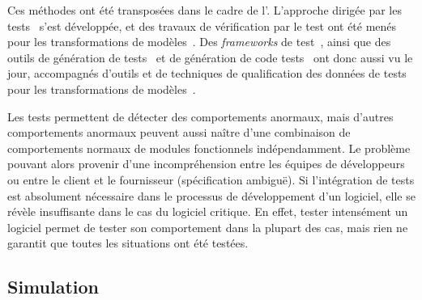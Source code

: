 Ces méthodes ont été transposées dans le cadre de l'{\idm}. L'approche dirigée
par les tests~\cite{Giner2009} s'est développée, et des travaux de vérification
par le test ont été menés pour les transformations de
modèles~\cite{Fleurey2004}. Des \emph{frameworks} de test~\cite{Lin2005}, ainsi
que des outils de génération de tests~\cite{Brottier2006,Lamari2007,Sen2009} et
de génération de code tests~\cite{Rutherford2003} ont donc aussi vu le jour,
accompagnés d'outils et de techniques de qualification des données de tests
pour les transformations de modèles~\cite{Fleurey2009}.

Les tests permettent de détecter des comportements anormaux, mais d'autres
comportements anormaux peuvent aussi naître d'une combinaison de comportements
normaux de modules fonctionnels indépendamment. Le problème pouvant alors
provenir d'une incompréhension entre les équipes de développeurs ou entre le
client et le fournisseur (spécification ambiguë). Si l'intégration de tests est
absolument nécessaire dans le processus de développement d'un logiciel, elle se
révèle insuffisante dans le cas du logiciel critique. En effet, tester
intensément un logiciel permet de tester son comportement dans la plupart des
cas, mais rien ne garantit que toutes les situations ont été testées.


\subsection{Simulation}
\label{ch:verification:subsec:simu}

